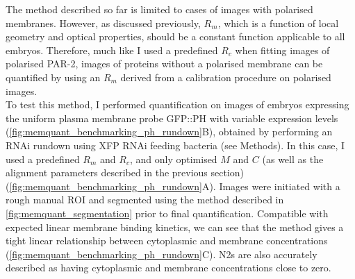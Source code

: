 \documentclass[12pt]{"report"}
\begin{document}
The method described so far is limited to cases of images with polarised membranes. However, as discussed previously, $R_m$, which is a function of local geometry and optical properties, should be a constant function applicable to all embryos. Therefore, much like I used a predefined $R_c$ when fitting images of polarised PAR-2, images of proteins without a polarised membrane can be quantified by using an $R_m$ derived from a calibration procedure on polarised images. \\

To test this method, I performed quantification on images of embryos expressing the uniform plasma membrane probe GFP::PH with variable expression levels (\cref{fig:memquant_benchmarking_ph_rundown}B), obtained by performing an RNAi rundown using XFP RNAi feeding bacteria (see Methods). In this case, I used a predefined $R_m$ and $R_c$, and only optimised $M$ and $C$ (as well as the alignment parameters described in the previous section) (\cref{fig:memquant_benchmarking_ph_rundown}A). Images were initiated with a rough manual ROI and segmented using the method described in \cref{fig:memquant_segmentation} prior to final quantification. Compatible with expected linear membrane binding kinetics, we can see that the method gives a tight linear relationship between cytoplasmic and membrane concentrations (\cref{fig:memquant_benchmarking_ph_rundown}C). N2s are also accurately described as having cytoplasmic and membrane concentrations close to zero.\\
\end{document}
